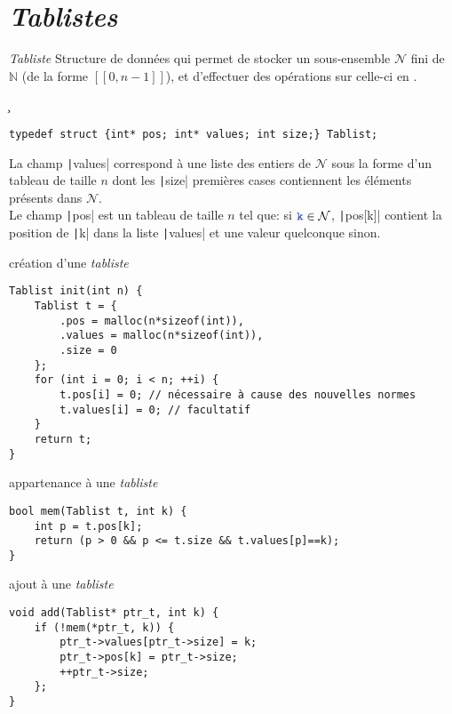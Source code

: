 \section{\emph{Tablistes}}
\begin{df*}{\emph{Tabliste}}
Structure de données qui permet de stocker un sous-ensemble $\mathcal{N}$ fini de $\mathbb{N}$ (de la forme $\left[\!\left[0,n-1\right]\!\right]$), et d'effectuer des opérations sur celle-ci en .
\end{df*}
\c
\begin{tp*}{}
\begin{verbatim}
typedef struct {int* pos; int* values; int size;} Tablist;
\end{verbatim}
La champ \texttt|values| correspond à une liste des entiers de $\mathcal{N}$ sous la forme d'un tableau de taille $n$ dont les \texttt|size| premières cases contiennent les éléments présents dans $\mathcal{N}$.\\Le champ \texttt|pos| est un tableau de taille $n$ tel que: si $\vr{k}\in\mathcal{N}$, \texttt|pos[k]| contient la position de \texttt|k| dans la liste \texttt|values| et une valeur quelconque sinon.
\end{tp*}
\begin{fnc*}{création d'une \emph{tabliste}}
\begin{verbatim}
Tablist init(int n) {
    Tablist t = {
        .pos = malloc(n*sizeof(int)),
        .values = malloc(n*sizeof(int)),
        .size = 0
    };
    for (int i = 0; i < n; ++i) {
        t.pos[i] = 0; // nécessaire à cause des nouvelles normes
        t.values[i] = 0; // facultatif
    }
    return t;
}
\end{verbatim}
\end{fnc*}
\begin{fnc*}{appartenance à une \emph{tabliste}}
\begin{verbatim}
bool mem(Tablist t, int k) {
    int p = t.pos[k];
    return (p > 0 && p <= t.size && t.values[p]==k);
}
\end{verbatim}
\end{fnc*}
\begin{fnc*}{ajout à une \emph{tabliste}}
\begin{verbatim}
void add(Tablist* ptr_t, int k) {
    if (!mem(*ptr_t, k)) {
        ptr_t->values[ptr_t->size] = k;
        ptr_t->pos[k] = ptr_t->size;
        ++ptr_t->size;
    };
}
\end{verbatim}
\end{fnc*}
